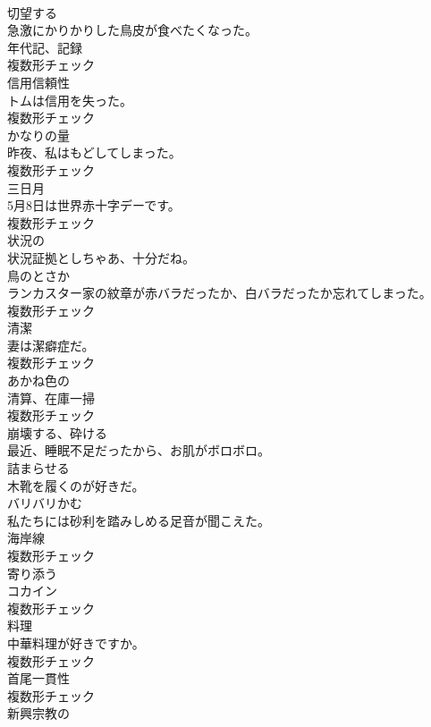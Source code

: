 \documentclass[8pt]{extreport}
\begin{document}
\begin{CJK}{UTF8}{min}
\\	[動詞]	切望する	
\\	急激にかりかりした鳥皮が食べたくなった。	
\\	[名詞]	年代記、記録	
\\	複数形チェック
\\	[名詞]	信用信頼性	
\\	トムは信用を失った。	
\\	複数形チェック
\\	[名詞]	かなりの量	
\\	昨夜、私はもどしてしまった。	
\\	複数形チェック
\\	[名詞]	三日月	
\\	5月8日は世界赤十字デーです。	
\\	複数形チェック
\\	[形容詞]	状況の	
\\	状況証拠としちゃあ、十分だね。	
\\	[名詞]	鳥のとさか	
\\	ランカスター家の紋章が赤バラだったか、白バラだったか忘れてしまった。	
\\	複数形チェック
\\	[名詞]	清潔	
\\	妻は潔癖症だ。	
\\	複数形チェック
\\	[形容詞]	あかね色の	
\\	[名詞]	清算、在庫一掃	
\\	複数形チェック
\\	[動詞]	崩壊する、砕ける	
\\	最近、睡眠不足だったから、お肌がボロボロ。	
\\	[動詞]	詰まらせる	
\\	木靴を履くのが好きだ。	
\\	[動詞]	バリバリかむ	
\\	私たちには砂利を踏みしめる足音が聞こえた。	
\\	[名詞]	海岸線	
\\	複数形チェック
\\	[動詞]	寄り添う	
\\	[名詞]	コカイン	
\\	複数形チェック
\\	[名詞]	料理	
\\	中華料理が好きですか。	
\\	複数形チェック
\\	[名詞]	首尾一貫性	
\\	複数形チェック
\\	[形容詞]	新興宗教の	

\end{CJK}
\end{document}

